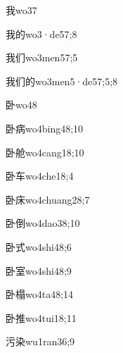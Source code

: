\begin{verbete}{我}{wo3}{7}
\end{verbete}
\begin{verbete}{我的}{wo3·de5}{7;8}
\end{verbete}
\begin{verbete}{我们}{wo3men5}{7;5}
\end{verbete}
\begin{verbete}{我们的}{wo3men5·de5}{7;5;8}
\end{verbete}
\begin{verbete}{卧}{wo4}{8}
\end{verbete}
\begin{verbete}{卧病}{wo4bing4}{8;10}
\end{verbete}
\begin{verbete}{卧舱}{wo4cang1}{8;10}
\end{verbete}
\begin{verbete}{卧车}{wo4che1}{8;4}
\end{verbete}
\begin{verbete}{卧床}{wo4chuang2}{8;7}
\end{verbete}
\begin{verbete}{卧倒}{wo4dao3}{8;10}
\end{verbete}
\begin{verbete}{卧式}{wo4shi4}{8;6}
\end{verbete}
\begin{verbete}{卧室}{wo4shi4}{8;9}
\end{verbete}
\begin{verbete}{卧榻}{wo4ta4}{8;14}
\end{verbete}
\begin{verbete}{卧推}{wo4tui1}{8;11}
\end{verbete}
\begin{verbete}{污染}{wu1ran3}{6;9}
\end{verbete}
